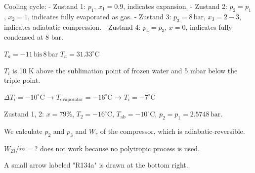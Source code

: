 Cooling cycle:  
- Zustand 1: \( p_1 \), \( x_1 = 0.9 \), indicates expansion.  
- Zustand 2: \( p_2 = p_1 \), \( x_2 = 1 \), indicates fully evaporated as gas.  
- Zustand 3: \( p_3 = 8 \, \text{bar} \), \( x_3 = 2-3 \), indicates adiabatic compression.  
- Zustand 4: \( p_4 = p_3 \), \( x = 0 \), indicates fully condensed at 8 bar.  

\( T_a = -11 \, \text{bis} \, 8 \, \text{bar} \)  
\( T_a = 31.33^\circ \text{C} \)  

\( T_i \) is 10 K above the sublimation point of frozen water and 5 mbar below the triple point.  

\( \Delta T_i = -10^\circ \text{C} \) → \( T_{\text{evaporator}} = -16^\circ \text{C} \) → \( T_i = -7^\circ \text{C} \)  

Zustand 1, 2: \( x = 79 \% \), \( T_2 = -16^\circ \text{C} \), \( T_{\text{ab}} = -10^\circ \text{C} \), \( p_2 = p_1 = 2.5748 \, \text{bar} \).  

We calculate \( p_2 \) and \( p_3 \) and \( W_r \) of the compressor, which is adiabatic-reversible.  

\( W_{23} / \dot{m} = ? \) does not work because no polytropic process is used.  

A small arrow labeled "R134a" is drawn at the bottom right.